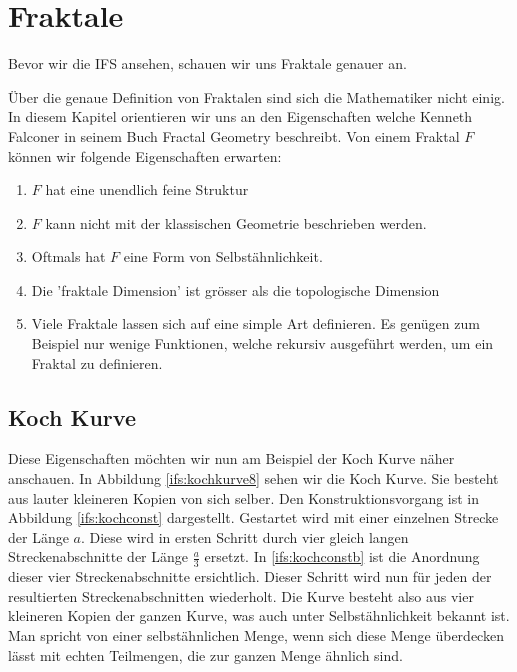 %
%
%
\section{Fraktale
\label{ifs:section:teil1}}
Bevor wir die IFS ansehen, schauen wir uns Fraktale genauer an.


Über die genaue Definition von Fraktalen sind sich die Mathematiker nicht einig. 
In diesem Kapitel orientieren wir uns an den Eigenschaften welche Kenneth Falconer in seinem Buch Fractal Geometry \cite{ifs:fractal-geometry} beschreibt.
Von einem Fraktal $F$ können wir folgende Eigenschaften erwarten: 
\begin{enumerate}
	\item $F$ hat eine unendlich feine Struktur
	\item $F$ kann nicht mit der klassischen Geometrie beschrieben werden.
	\item Oftmals hat $F$ eine Form von Selbstähnlichkeit.
	\item Die 'fraktale Dimension' ist grösser als die topologische Dimension
	\item Viele Fraktale lassen sich auf eine simple Art definieren. Es genügen zum Beispiel nur wenige Funktionen, welche rekursiv ausgeführt werden, um ein Fraktal zu definieren.  
\end{enumerate}
\subsection{Koch Kurve
	\label{ifs:subsection:lilkoch}}
Diese Eigenschaften möchten wir nun am Beispiel der Koch Kurve näher anschauen.
In Abbildung \ref{ifs:kochkurve8} sehen wir die Koch Kurve. Sie besteht aus lauter kleineren Kopien von sich selber. 
Den Konstruktionsvorgang ist in Abbildung \ref{ifs:kochconst} dargestellt.
Gestartet wird mit einer einzelnen Strecke der Länge $a$.
Diese wird in ersten Schritt durch vier gleich langen Streckenabschnitte der Länge $\frac{a}{3}$ ersetzt.
In \ref{ifs:kochconstb} ist die Anordnung dieser vier Streckenabschnitte ersichtlich. 
Dieser Schritt wird nun für jeden der resultierten Streckenabschnitten wiederholt.
Die Kurve besteht also aus vier kleineren Kopien der ganzen Kurve, was auch unter Selbstähnlichkeit bekannt ist.
Man spricht von einer selbstähnlichen Menge, wenn sich diese Menge überdecken lässt mit echten Teilmengen, die zur ganzen Menge ähnlich sind.


